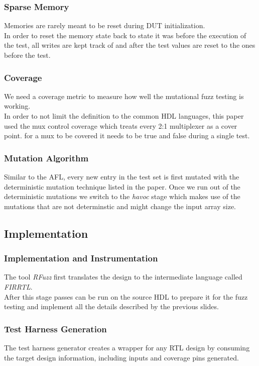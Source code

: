 \documentclass{beamer}
\begin{document}
\begin{frame}
    \frametitle{Sparse Memory}
    Memories are rarely meant to be reset during DUT initialization. \\
    In order to reset the memory state back to state it was before the
    execution of the test, all writes are kept track of and after
    the test values are reset to the ones before the test.
\end{frame}

\begin{frame}
    \frametitle{Coverage}
    We need a coverage metric to measure how well the mutational fuzz testing
    is working. \\
    In order to not limit the definition to the common HDL
    languages, this paper used the mux control coverage which treats every
    2:1 multiplexer as a cover point. for a mux to be covered it needs to be
    true and false during a single test.
\end{frame}

\begin{frame}
    \frametitle{Mutation Algorithm}
    Similar to the AFL, every new entry in the test set is first mutated
    with the deterministic mutation technique listed in the paper. Once we run
    out of the deterministic mutations we switch to the \textit{havoc} stage
    which makes use of the mutations that are not determinstic and might
    change the input array size.
\end{frame}

\subsection{Implementation}
\begin{frame}
    \frametitle{Implementation and Instrumentation}
    The tool \textit{RFuzz} first translates the design to the intermediate
    language called \textit{FIRRTL}. \\
    After this stage passes can be run on the source HDL to prepare it for
    the fuzz testing and implement all the details described by the previous
    slides.
\end{frame}

\begin{frame}
    \frametitle{Test Harness Generation}
    The test harness generator creates a wrapper for any RTL design by
    consuming the target design information, including inputs and coverage pins
    generated.
\end{frame}
\end{document}
